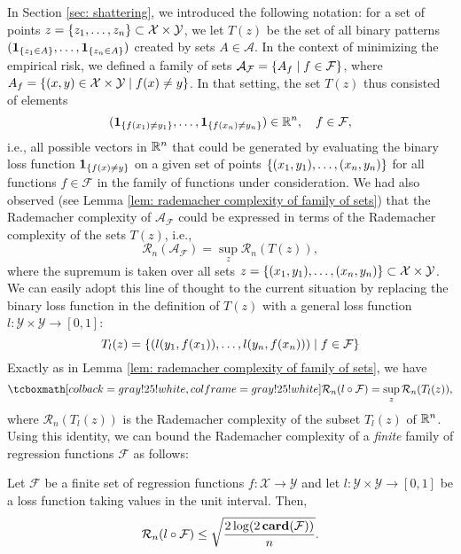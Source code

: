 In Section \ref{sec: shattering}, we introduced the following notation: for a set of points $z = \left\{z_1, \dots, z_n\right\} \subset \mathcal{X} \times \mathcal{Y}$, we let $T(z)$ be the set of all binary patterns $(\mathbf{1}_{\left\{z_1 \in A\right\}}, \dots, \mathbf{1}_{\left\{z_n \in A\right\}})$ created by sets $A \in \mathcal{A}$. In the context of minimizing the empirical risk, we defined a family of sets $\mathcal{A}_{\mathcal{F}} = \left\{A_f \mathrel{|} f \in \mathcal{F}\right\}$, where $A_f = \left\{(x, y) \in \mathcal{X} \times \mathcal{Y} \mathrel{|} f(x) \neq y\right\}$. In that setting, the set $T(z)$ thus consisted of elements
\[
    (\mathbf{1}_{\left\{f(x_1) \neq y_1\right\}}, \dots, \mathbf{1}_{\left\{f(x_n) \neq y_n\right\}}) \in \mathbb{R}^n, \quad f \in \mathcal{F},
\]
i.e., all possible vectors in $\mathbb{R}^n$ that could be generated by evaluating the binary loss function $\mathbf{1}_{\left\{f(x) \neq y\right\}}$ on a given set of points $\left\{(x_1, y_1), \dots, (x_n, y_n)\right\}$ for all functions $f \in \mathcal{F}$ in the family of functions under consideration. We had also observed (see Lemma \ref{lem: rademacher complexity of family of sets}) that the Rademacher complexity of $\mathcal{A}_{\mathcal{F}}$ could be expressed in terms of the Rademacher complexity of the sets $T(z)$, i.e.,
\[
    \mathcal{R}_n(\mathcal{A}_{\mathcal{F}}) = \sup_{z} \mathcal{R}_n(T(z)),
\]
where the supremum is taken over all sets $z = \left\{(x_1, y_1), \dots, (x_n, y_n)\right\} \subset \mathcal{X} \times \mathcal{Y}$. We can easily adopt this line of thought to the current situation by replacing the binary loss function in the definition of $T(z)$ with a general loss function $l \colon \mathcal{Y} \times \mathcal{Y} \to [0, 1]$:
\begin{equation}
    T_l(z) = \left\{( l(y_1, f(x_1)), \dots, l(y_n, f(x_n)) ) \mathrel{|} f \in \mathcal{F}\right\}
\end{equation}
Exactly as in Lemma \ref{lem: rademacher complexity of family of sets}, we have
\begin{equation}
\label{eq: rademacher complexity for general loss}
    \highlightMath{
        \mathcal{R}_n(l \circ \mathcal{F}) = \sup_z \mathcal{R}_n(T_l(z)),
    }
\end{equation}
where $\mathcal{R}_n(T_l(z))$ is the Rademacher complexity of the subset $T_l(z)$ of $\mathbb{R}^n$. Using this identity, we can bound the Rademacher complexity of a \emph{finite} family of regression functions $\mathcal{F}$ as follows:
\begin{proposition}
Let $\mathcal{F}$ be a finite set of regression functions $f \colon \mathcal{X} \to \mathcal{Y}$ and let $l \colon \mathcal{Y} \times \mathcal{Y} \to [0, 1]$ be a loss function taking values in the unit interval. Then,
\[
    \mathcal{R}_n(l \circ \mathcal{F}) \leq \sqrt{\frac{2 \log(2 \, \mathrm{\mathbf{card}}(\mathcal{F}))}{n}}.
\]
\end{proposition}

